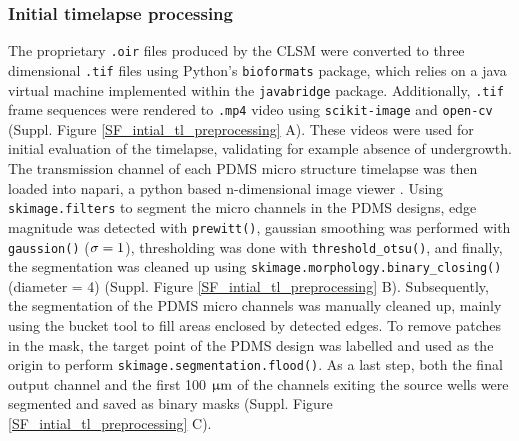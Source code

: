 \subsubsection{Initial timelapse processing}
The proprietary \verb|.oir| files produced by the CLSM were converted to three
dimensional \verb|.tif| files using Python's \verb|bioformats| package, which
relies on a java virtual machine implemented within the \verb|javabridge|
package. Additionally, \verb|.tif| frame sequences were rendered to \verb|.mp4|
video using \verb|scikit-image| and \verb|open-cv| (Suppl. Figure
\ref{SF_intial_tl_preprocessing} A). These videos were used for initial
evaluation of the timelapse, validating for example absence of undergrowth. The
transmission channel of each PDMS micro structure timelapse was then loaded into
napari, a python based n-dimensional image viewer \parencite{Sofroniew2021}.
Using \verb|skimage.filters| to segment the micro channels in the PDMS designs,
edge magnitude was detected with \verb|prewitt()|, gaussian smoothing was
performed with \verb|gaussion()| ($\rm\sigma=1$), thresholding was done with
\verb|threshold_otsu()|, and finally, the segmentation was cleaned up using
\verb|skimage.morphology.binary_closing()| (diameter = 4) (Suppl. Figure
\ref{SF_intial_tl_preprocessing} B). Subsequently, the segmentation of the PDMS
micro channels was manually cleaned up, mainly using the bucket tool to fill
areas enclosed by detected edges. To remove patches in the mask, the target
point of the PDMS design was labelled and used as the origin to perform
\verb|skimage.segmentation.flood()|. As a last step, both the final output
channel and the first 100 $\rm\upmu m$ of the channels exiting the source wells
were segmented and saved as binary masks (Suppl. Figure
\ref{SF_intial_tl_preprocessing} C).

